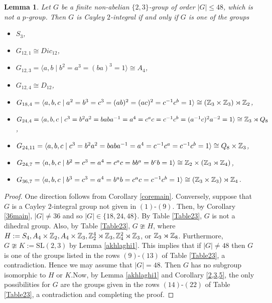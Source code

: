 \documentclass{amsart}
\newtheorem{lem}[thm]{Lemma}
\def \leq {\leqslant}
\begin{document}
\begin{lem}\label{upto48}
	Let $G$ be a finite non-abelian $\{2,3\}$-group of order $|G|\leq 48$, which is not a $p$-group. Then $G$ is Cayley $2$-integral if and only if $G$ is one of the groups
	\begin{itemize}
		\item[(1)] $S_3$,
		\item[(2)] $G_{12,1}\cong Dic_{12}$,
		\item[(3)] $G_{12,3}=\langle a,b\mid   b^2=a^3=(ba)^3=1 \rangle\cong A_4$,
		\item[(4)] $G_{12,4}\cong D_{12}$,
		\item[(5)] $G_{18,4}=\langle a,b,c\mid  a^2=b^3=c^3=(ab)^2=(ac)^2=c^{-1}c^b=1 \rangle\cong (\Bbb Z_3\times \Bbb Z_3)\rtimes \Bbb Z_2$,
		\item[(6)] $G_{24,4}=\langle a,b,c\mid  c^3=b^2a^2=baba^{-1}=a^4=c^ac=c^{-1}c^b=(a^{-1}c)^2a^{-2}=1 \rangle \cong\Bbb Z_3\rtimes Q_8$,
		\item[(7)] $G_{24,11}=\langle a,b,c\mid  c^3=b^2a^2=baba^{-1}=a^4=c^{-1}c^a=c^{-1}c^b=1\rangle\cong Q_8 \times\Bbb Z_3 $,
		\item[(8)] $G_{24,7}=\langle a,b,c\mid b^2=c^3=a^4=c^ac=bb^a=b^cb=1 \rangle\cong\Bbb Z_2\times(\Bbb Z_3\rtimes \Bbb Z_4)$,
		\item[(9)] $G_{36,7}=\langle a,b,c\mid  b^3=c^3=a^4=b^ab=c^ac= c^{-1}c^b=1 \rangle \cong(\Bbb Z_3\times \Bbb Z_3)\rtimes \Bbb Z_4$.
	\end{itemize}
\end{lem}
\begin{proof}
One direction follows from Corollary \ref{coremain}. Conversely, suppose that $G$ is a Cayley $2$-integral group not given in $(1)$-$(9)$. Then, by Corollary \ref{36main}, $|G|\neq 36$ and so $|G|\in\{18,24,48\}$.  By Table \ref{Table23}, $G$ is not a dihedral group. Also, by Table \ref{Table23}, $G\ncong H$, where  $H:= S_{4}, A_4\times\Bbb Z_2, A_4\times\Bbb Z_3, \Bbb Z_2^4\rtimes\Bbb Z_3, \Bbb Z_4^2\rtimes\Bbb Z_3$, or $ \Bbb Z_3\rtimes\Bbb Z_8$. Furthermore, $G\ncong K:=\textrm{SL}(2,3)$ by Lemma \ref{akhlaghi1}. This implies that if $|G|\neq 48$ then $G$ is one of the groups listed in the rows $(9)$-$(13)$ of Table \ref{Table23}, a contradiction. Hence we may assume that $|G|=48$. Then $G$ has no subgroup isomorphic to $H$ or $K$.Now, by Lemma \ref{akhlaghi1} and Corollary \ref{2,3,5}, the only possibilities for $G$ are the groups given in the rows $(14)$-$(22)$ of Table \ref{Table23}, a contradiction and completing the proof. 
\end{proof}
\end{document}
